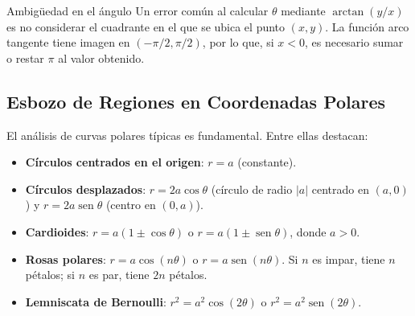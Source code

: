 \documentclass[11pt,a4paper]{article}
\begin{document}
\begin{errorbox}{Ambigüedad en el ángulo}
Un error común al calcular $\theta$ mediante $\arctan(y/x)$ es no considerar el cuadrante en el que se ubica el punto $(x,y)$. La función arco tangente tiene imagen en $(-\pi/2, \pi/2)$, por lo que, si $x < 0$, es necesario sumar o restar $\pi$ al valor obtenido.
\end{errorbox}

\subsection{Esbozo de Regiones en Coordenadas Polares}

El análisis de curvas polares típicas es fundamental. Entre ellas destacan:
\begin{itemize}
    \item \textbf{Círculos centrados en el origen}: $r = a$ (constante).
    \item \textbf{Círculos desplazados}: $r = 2a \cos \theta$ (círculo de radio $|a|$ centrado en $(a,0)$) y $r = 2a \operatorname{sen} \theta$ (centro en $(0,a)$).
    \item \textbf{Cardioides}: $r = a(1 \pm \cos \theta)$ o $r = a(1 \pm \operatorname{sen} \theta)$, donde $a > 0$.
    \item \textbf{Rosas polares}: $r = a \cos(n\theta)$ o $r = a \operatorname{sen}(n\theta)$. Si $n$ es impar, tiene $n$ pétalos; si $n$ es par, tiene $2n$ pétalos.
    \item \textbf{Lemniscata de Bernoulli}: $r^2 = a^2 \cos(2\theta)$ o $r^2 = a^2 \operatorname{sen}(2\theta)$.
\end{itemize}
\end{document}
